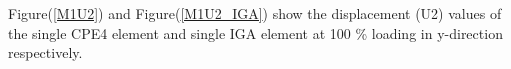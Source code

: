 \documentclass[11pt]{article}
\begin{document}

Figure(\ref{M1U2}) and Figure(\ref{M1U2_IGA}) show the displacement (U2) values of the single CPE4 element and single IGA element at 100 \% loading in y-direction respectively. \\
\end{document}
